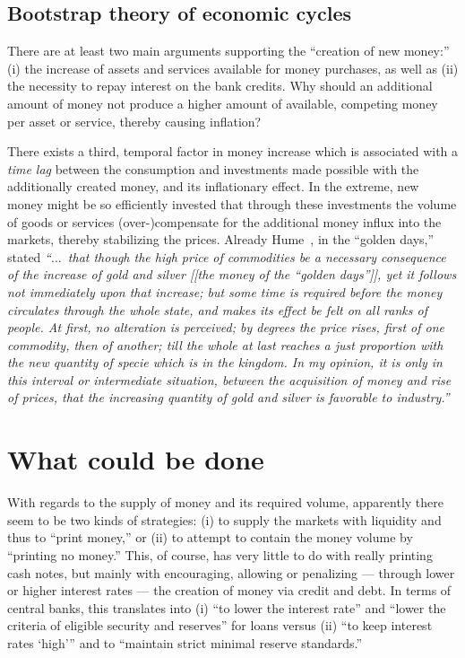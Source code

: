 \documentclass[aps,rmp,preprint,amsfonts,showpacs,showkeys]{revtex4}
\begin{document}
\subsection{Bootstrap theory of economic cycles}

There are at least two main arguments supporting the ``creation of new money:''
(i) the increase of assets and services available for money purchases, as well as (ii) the necessity to repay interest on the bank credits.
Why should an additional amount of money not produce a higher amount of available, competing money per asset or service, thereby causing inflation?

There exists a third, temporal factor in money increase which is associated with a {\em time lag}
between the consumption and investments made possible with the additionally created money, and its inflationary effect.
In the extreme, new money might be so efficiently invested that through these investments the volume of goods or services  (over-)compensate for
the additional money influx into the markets, thereby stabilizing the prices.
Already
Hume~\cite[II.III.7]{Hume-1742}, in the ``golden days,'' stated
{\em ``$\ldots$~that though the high price of commodities be a necessary consequence of the increase of gold and silver [[the money of the ``golden days'']],
yet it follows not immediately upon that increase; but some time is required before the money circulates through the whole state,
and makes its effect be felt on all ranks of people.
At first, no alteration is perceived; by degrees the price rises, first of one commodity, then of another;
till the whole at last reaches a just proportion with the new quantity of specie which is in the kingdom.
In my opinion, it is only in this interval or intermediate situation, between the acquisition of money and rise of prices,
that the increasing quantity of gold and silver is favorable to industry.''}



\section{What could be done}


With regards to the supply of money and its required volume,
apparently there seem to be two kinds of strategies:
(i) to supply the markets with liquidity and thus to ``print money,''
or
(ii) to attempt to contain the money volume by ``printing no money.''
This, of course, has very little to do with really printing cash notes, but mainly with encouraging,
allowing or penalizing --- through lower or higher interest rates --- the creation of money via credit and debt.
In terms of central banks, this translates into (i) ``to lower the interest rate'' and ``lower the criteria of eligible security and reserves'' for loans versus
(ii) ``to keep interest rates `high''' and to ``maintain strict minimal reserve standards.''
\end{document}
